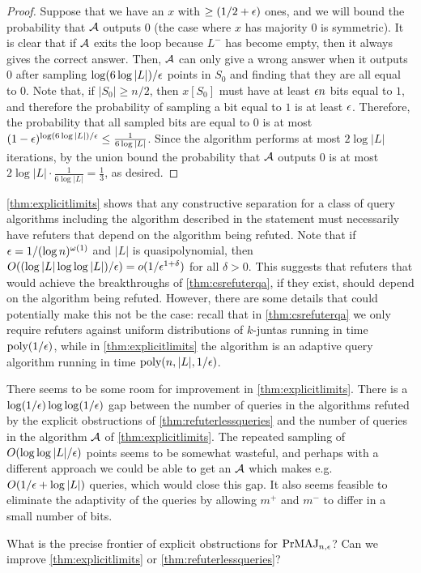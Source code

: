 \begin{proof}
Suppose that we have an $x$ with $\geq (1/2 + \epsilon)$ ones, and we will bound the probability that $\mathcal{A}$ outputs $0$ (the
case where $x$ has majority $0$ is symmetric).
It is clear that if $\mathcal{A}$ exits the loop because $L^-$ has become empty, then it always gives the correct answer.
Then, $\mathcal{A}$ can only give a wrong answer when it outputs $0$ after sampling $\log (6 \log |L|)/\epsilon$ points in $S_0$
and finding that they are all equal to $0$. 
Note that, if $|S_0| \geq n/2$, then $x[S_0]$ must have
at least $\epsilon n$ bits equal to $1$, and therefore the probability of sampling a bit equal to $1$ is at least $\epsilon$.
Therefore, the probability that all sampled bits are equal to $0$ is at most 
$(1-\epsilon)^{\log (6 \log |L|)/\epsilon} \leq \frac{1}{6 \log |L|}$. 
Since the algorithm performs at most $2 \log |L|$ iterations,
by the union bound the probability that $\mathcal{A}$ outputs $0$
is at most $2 \log |L| \cdot \frac{1}{6 \log |L|} = \frac{1}{3}$, as desired. 



\end{proof}


\cref{thm:explicitlimits} shows that any constructive separation for a class of query algorithms including the algorithm described in 
the statement must necessarily have refuters that depend on the algorithm being refuted. 
Note that if $\epsilon = 1/(\log n)^{\omega(1)}$ and $|L|$ is quasipolynomial, then $O((\log |L| \log \log |L|)/\epsilon) = o(1/\epsilon^{1+\delta})$ for all 
$\delta > 0$. 
This suggests that refuters that would achieve the breakthroughs of \cref{thm:csrefuterqa},
if they exist, should depend on the algorithm being refuted.
However, there are some details that could potentially make this not be the case: recall that
in \cref{thm:csrefuterqa} we only require refuters against uniform distributions of $k$-juntas
running in time $\text{poly}(1/\epsilon)$,
while in \cref{thm:explicitlimits} the algorithm is an adaptive
query algorithm running in time $\text{poly}(n, |L|, 1/\epsilon)$. 

There seems to be some room for improvement in \cref{thm:explicitlimits}.
There is a $\log (1/\epsilon) \log \log (1/\epsilon)$ gap between the number of 
queries in the algorithms refuted by the explicit obstructions of \cref{thm:refuterlessqueries}
and the number of queries in the 
algorithm $\mathcal{A}$ of \cref{thm:explicitlimits}.
The repeated sampling of $O(\log \log |L|/\epsilon)$ points seems to be somewhat wasteful, and 
perhaps with a different approach we could be able to get an $\mathcal{A}$ which makes e.g. $O(1/\epsilon + \log |L|)$ queries, 
which would close this gap.
It also seems feasible to eliminate the adaptivity of the queries by allowing $m^+$ and $m^-$
to differ in a small number of bits.  

\begin{question}
What is the precise frontier of explicit obstructions for $\mathrm{PrMAJ}_{n, \epsilon}$? Can we improve \cref{thm:explicitlimits} or \cref{thm:refuterlessqueries}?
\end{question}